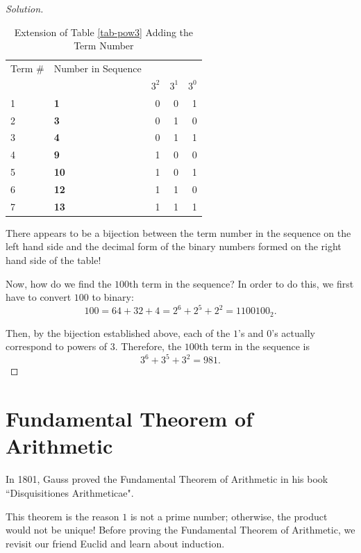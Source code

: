\begin{proof}[Solution]
\begin{table}[h]
	\centering
	\begin{tabular}{|l|l | r r r|}
		\toprule
		Term \# & Number in Sequence & & &\\
		& & $3^2$ & $3^1$ & $3^0$ \\ 
		\midrule
		1&\textbf{1} & 0 & 0 & 1 \\
		2&\textbf{3} & 0 & 1 & 0 \\
		3&\textbf{4} & 0 & 1 & 1 \\
		4&\textbf{9} & 1 & 0 & 0 \\
		5&\textbf{10} & 1 & 0 & 1 \\
		6&\textbf{12} & 1 & 1 & 0 \\
		7&\textbf{13} & 1 & 1 & 1 \\
		\bottomrule
	\end{tabular}
	\caption{Extension of Table \ref{tab-pow3} Adding the Term Number}
\end{table}

\clearpage

There appears to be a bijection between the term number in the sequence on the left hand side and the decimal form of the binary numbers formed on the right hand side of the table! 

Now, how do we find the $100$th term in the sequence? In order to do this, we first have to convert $100$ to binary: $$100=64+32+4=2^6+2^5+2^2=1100100_2.$$  

Then, by the bijection established above, each of the $1$'s and $0$'s actually correspond to powers of $3$. Therefore, the $100$th term in the sequence is $$3^6+3^5+3^2=\boxed{981}.$$  \end{proof}



\clearpage



\section{Fundamental Theorem of Arithmetic}

In 1801, Gauss proved the Fundamental Theorem of Arithmetic in his book ``Disquisitiones Arithmeticae". 


This theorem is the reason $1$ is not a prime number; otherwise, the product would not be unique! Before proving the Fundamental Theorem of Arithmetic, we revisit our friend Euclid and learn about induction. 
\clearpage

